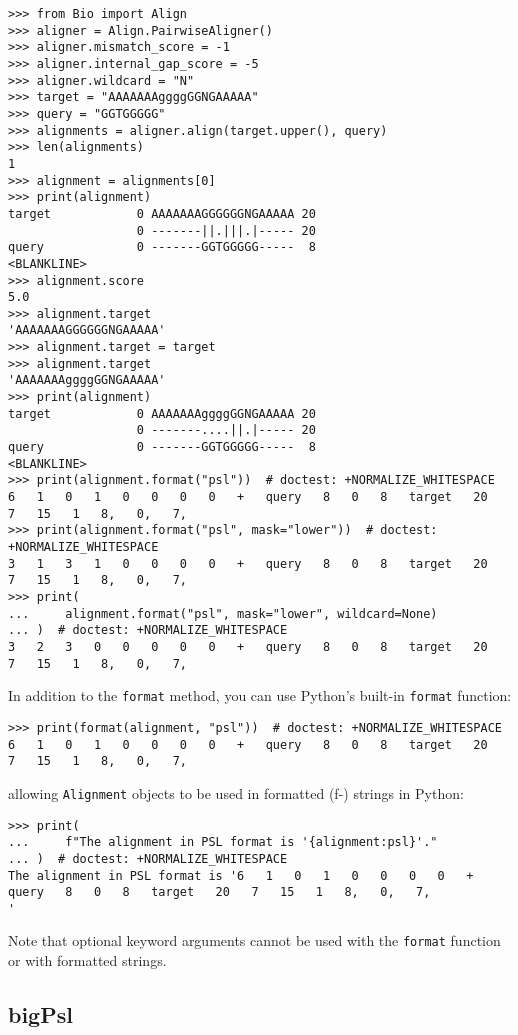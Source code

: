 \begin{verbatim}
>>> from Bio import Align
>>> aligner = Align.PairwiseAligner()
>>> aligner.mismatch_score = -1
>>> aligner.internal_gap_score = -5
>>> aligner.wildcard = "N"
>>> target = "AAAAAAAggggGGNGAAAAA"
>>> query = "GGTGGGGG"
>>> alignments = aligner.align(target.upper(), query)
>>> len(alignments)
1
>>> alignment = alignments[0]
>>> print(alignment)
target            0 AAAAAAAGGGGGGNGAAAAA 20
                  0 -------||.|||.|----- 20
query             0 -------GGTGGGGG-----  8
<BLANKLINE>
>>> alignment.score
5.0
>>> alignment.target
'AAAAAAAGGGGGGNGAAAAA'
>>> alignment.target = target
>>> alignment.target
'AAAAAAAggggGGNGAAAAA'
>>> print(alignment)
target            0 AAAAAAAggggGGNGAAAAA 20
                  0 -------....||.|----- 20
query             0 -------GGTGGGGG-----  8
<BLANKLINE>
>>> print(alignment.format("psl"))  # doctest: +NORMALIZE_WHITESPACE
6   1   0   1   0   0   0   0   +   query   8   0   8   target   20   7   15   1   8,   0,   7,
>>> print(alignment.format("psl", mask="lower"))  # doctest: +NORMALIZE_WHITESPACE
3   1   3   1   0   0   0   0   +   query   8   0   8   target   20   7   15   1   8,   0,   7,
>>> print(
...     alignment.format("psl", mask="lower", wildcard=None)
... )  # doctest: +NORMALIZE_WHITESPACE
3   2   3   0   0   0   0   0   +   query   8   0   8   target   20   7   15   1   8,   0,   7,
\end{verbatim}

In addition to the \verb+format+ method, you can use Python's built-in \verb+format+ function:
\begin{verbatim}
>>> print(format(alignment, "psl"))  # doctest: +NORMALIZE_WHITESPACE
6   1   0   1   0   0   0   0   +   query   8   0   8   target   20   7   15   1   8,   0,   7,
\end{verbatim}
allowing \verb+Alignment+ objects to be used in formatted (f-) strings in Python:
\begin{verbatim}
>>> print(
...     f"The alignment in PSL format is '{alignment:psl}'."
... )  # doctest: +NORMALIZE_WHITESPACE
The alignment in PSL format is '6   1   0   1   0   0   0   0   +   query   8   0   8   target   20   7   15   1   8,   0,   7,
'
\end{verbatim}
Note that optional keyword arguments cannot be used with the \verb+format+ function or with formatted strings.

\subsection{bigPsl}
\label{subsec:align_bigpsl}

